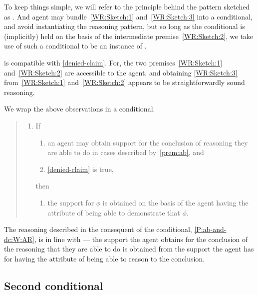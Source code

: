 \begin{note}[Attribute]
  To keep things simple, we will refer to the principle behind the pattern sketched as \AR{}.
  And agent may bundle~\ref{WR:Sketch:1} and~\ref{WR:Sketch:3} into a conditional, and avoid instantiating the reasoning pattern, but so long as the conditional is (implicitly) held on the basis of the intermediate premise~\ref{WR:Sketch:2}, we take use of such a conditional to be an instance of \AR{}.

  \AR{} is compatible with \ref{denied-claim}.
  For, the two premises~\ref{WR:Sketch:1} and~\ref{WR:Sketch:2} are accessible to the agent, and obtaining \ref{WR:Sketch:3} from~\ref{WR:Sketch:1} and~\ref{WR:Sketch:2} appears to be straightforwardly sound reasoning.
\end{note}

\begin{note}
  We wrap the above observations in a conditional.
  \begin{quote}
    \begin{enumerate}[label=(C\arabic*), ref=(C\arabic*)]
    \item\label{P:ab-and-dc:W} If
      \begin{enumerate}[label=(\alph*)]
      \item\label{P:ab-and-dc:W:ab} an agent may obtain support for the conclusion of reasoning they are able to do in cases described by~\ref{prem:ab}, and
      \item\label{P:ab-and-dc:W:uRa} \ref{denied-claim} is true,
      \end{enumerate}
      then
      \begin{enumerate}[label=(\alph*), resume]
      \item\label{P:ab-and-dc:W:AR} the support for \(\phi\) is obtained on the basis of the agent having the attribute of being able to demonstrate that \(\phi\).
      \end{enumerate}
    \end{enumerate}
  \end{quote}
  The reasoning described in the consequent of the conditional, \ref{P:ab-and-dc:W:AR}, is in line with \AR{} --- the support the agent obtains for the conclusion of the reasoning that they are able to do is obtained from the support the agent has for having the attribute of being able to reason to the conclusion.
\end{note}

\subsection{Second conditional}
\label{sec:second-conditional}


